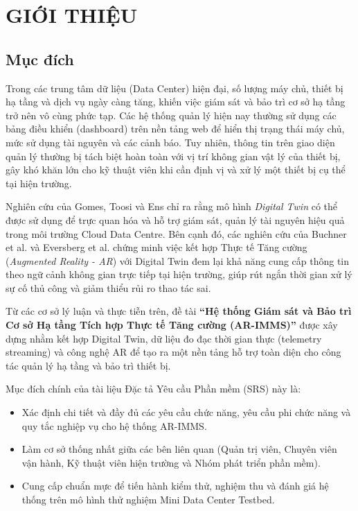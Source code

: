 \chapter{GIỚI THIỆU}

\section{Mục đích}
Trong các trung tâm dữ liệu (Data Center) hiện đại, số lượng máy chủ, thiết bị hạ tầng và dịch vụ ngày càng tăng, khiến việc giám sát và bảo trì cơ sở hạ tầng trở nên vô cùng phức tạp. Các hệ thống quản lý hiện nay thường sử dụng các bảng điều khiển (dashboard) trên nền tảng web để hiển thị trạng thái máy chủ, mức sử dụng tài nguyên và các cảnh báo. Tuy nhiên, thông tin trên giao diện quản lý thường bị tách biệt hoàn toàn với vị trí không gian vật lý của thiết bị, gây khó khăn lớn cho kỹ thuật viên khi cần định vị và xử lý một thiết bị cụ thể tại hiện trường.

Nghiên cứu của Gomes, Toosi và Ens chỉ ra rằng mô hình \textit{Digital Twin} có thể được sử dụng để trực quan hóa và hỗ trợ giám sát, quản lý tài nguyên hiệu quả trong môi trường Cloud Data Centre. Bên cạnh đó, các nghiên cứu của Buchner et al. và Eversberg et al. chứng minh việc kết hợp Thực tế Tăng cường (\textit{Augmented Reality - AR}) với Digital Twin đem lại khả năng cung cấp thông tin theo ngữ cảnh không gian trực tiếp tại hiện trường, giúp rút ngắn thời gian xử lý sự cố thủ công và giảm thiểu rủi ro thao tác sai.

Từ các cơ sở lý luận và thực tiễn trên, đề tài \textbf{“Hệ thống Giám sát và Bảo trì Cơ sở Hạ tầng Tích hợp Thực tế Tăng cường (AR-IMMS)”} được xây dựng nhằm kết hợp Digital Twin, dữ liệu đo đạc thời gian thực (telemetry streaming) và công nghệ AR để tạo ra một nền tảng hỗ trợ toàn diện cho công tác quản lý hạ tầng và bảo trì thiết bị.

Mục đích chính của tài liệu Đặc tả Yêu cầu Phần mềm (SRS) này là:
\begin{itemize}
    \item Xác định chi tiết và đầy đủ các yêu cầu chức năng, yêu cầu phi chức năng và quy tắc nghiệp vụ cho hệ thống AR-IMMS.
    \item Làm cơ sở thống nhất giữa các bên liên quan (Quản trị viên, Chuyên viên vận hành, Kỹ thuật viên hiện trường và Nhóm phát triển phần mềm).
    \item Cung cấp chuẩn mực để tiến hành kiểm thử, nghiệm thu và đánh giá hệ thống trên mô hình thử nghiệm Mini Data Center Testbed.
\end{itemize}


